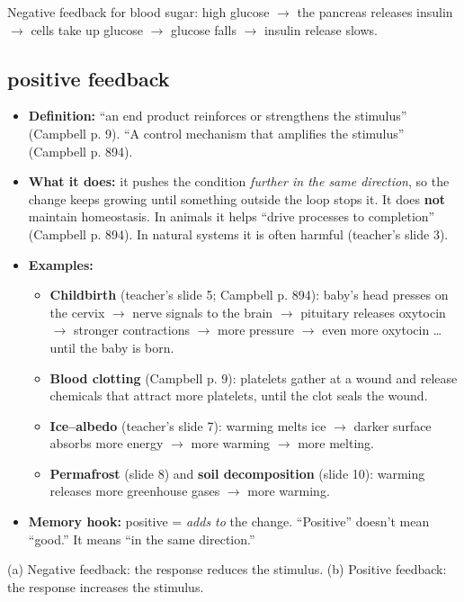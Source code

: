 \documentclass[11pt,letterpaper]{article}
\begin{document}
  {Negative feedback for blood sugar: high glucose $\rightarrow$ the pancreas releases insulin $\rightarrow$ cells take up glucose $\rightarrow$ glucose falls $\rightarrow$ insulin release slows.}

\subsection{positive feedback}
\begin{itemize}
  \item \textbf{Definition:} ``an end product reinforces or strengthens the stimulus'' (Campbell p. 9). ``A control mechanism that amplifies the stimulus'' (Campbell p. 894).
  \item \textbf{What it does:} it pushes the condition \emph{further in the same direction}, so the change keeps growing until something outside the loop stops it. It does \textbf{not} maintain homeostasis. In animals it helps ``drive processes to completion'' (Campbell p. 894). In natural systems it is often harmful (teacher's slide 3).
  \item \textbf{Examples:}
  \begin{itemize}
    \item \textbf{Childbirth} (teacher's slide 5; Campbell p. 894): baby's head presses on the cervix $\rightarrow$ nerve signals to the brain $\rightarrow$ pituitary releases oxytocin $\rightarrow$ stronger contractions $\rightarrow$ more pressure $\rightarrow$ even more oxytocin \dots{} until the baby is born.
    \item \textbf{Blood clotting} (Campbell p. 9): platelets gather at a wound and release chemicals that attract more platelets, until the clot seals the wound.
    \item \textbf{Ice–albedo} (teacher's slide 7): warming melts ice $\rightarrow$ darker surface absorbs more energy $\rightarrow$ more warming $\rightarrow$ more melting.
    \item \textbf{Permafrost} (slide 8) and \textbf{soil decomposition} (slide 10): warming releases more greenhouse gases $\rightarrow$ more warming.
  \end{itemize}
  \item \textbf{Memory hook:} positive = \emph{adds to} the change. ``Positive'' doesn't mean ``good.'' It means ``in the same direction.''
\end{itemize}

  {(a) Negative feedback: the response reduces the stimulus. (b) Positive feedback: the response increases the stimulus.}
\end{document}
